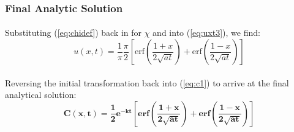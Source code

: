 \subsubsection*{Final Analytic Solution}
\paragraph{}
Substituting (\ref{eq:chidef}) back in for $\chi$ and into (\ref{eq:uxt3}), we find:
\begin{equation}
\label{eq:uxt4}
u(x,t) = \frac{1}{\pi} \frac{\pi}{2} \left[ \text{erf}\left(\frac{1+x}{2\sqrt{at}}\right) + \text{erf}\left(\frac{1-x}{2\sqrt{at}}\right) \right]
\end{equation}
\paragraph{}
Reversing the initial transformation back into (\ref{eq:c1}) to arrive at the final analytical solution:
\begin{equation}
\label{eq:fas}
\mathbf{C(x,t) = \frac{1}{2} e^{-kt} \left[ \text{erf}\left(\frac{1+x}{2\sqrt{at}}\right) + \text{erf}\left(\frac{1-x}{2\sqrt{at}}\right) \right]}
\end{equation}
